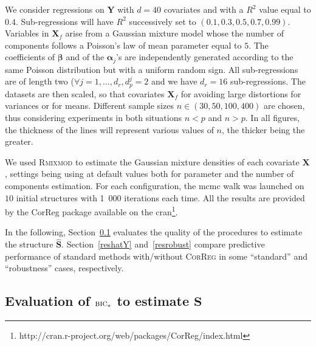 \documentclass[11pt,a4paper]{article}
\begin{document}
We consider regressions on $\boldsymbol{Y}$ with $d=40$ covariates and with a $R^2$ value equal to $0.4$. Sub-regressions will have $R^2$ successively set to $(0.1,0.3,0.5,0.7,0.99)$. Variables in $\boldsymbol{X}_f$ arise from a Gaussian mixture model whose the number of components follows a Poisson's law of mean parameter equal to $5$. The coefficients of $\boldsymbol{\beta}$ and of the $\boldsymbol{\alpha}_j$'s are independently generated according to the same Poisson distribution but with a uniform random sign. All sub-regressions are of length two ($\forall j=1,\ldots,d_r, d_p^j=2$ and we have $d_r=16$ sub-regressions. The datasets are then scaled, so that covariates $\boldsymbol{X}_f$ for avoiding large distortions for variances or for means.	Different sample sizes  $n\in (30,50,100,400)$ are chosen, thus considering experiments in both situations $n<p$ and $n>p$. In all figures, the thickness of the lines will represent various values of $n$, the thicker being the greater.

We used \textsc{Rmixmod} \cite{remi:hal-00919486} to estimate the Gaussian mixture densities of each covariate $\boldsymbol{X}$, settings being using at default values both for parameter and the number of components estimation. For each configuration, the {\sc mcmc} walk was launched on $10$ initial structures with 1~000 iterations each time. All the results are provided by the {\sc CorReg} package available on the {\sc cran}\footnote{http://cran.r-project.org/web/packages/CorReg/index.html}.

\vspace{3mm}	

In the following, Section~\ref{sec:simS} evaluates the quality of the  procedures to estimate the structure $\hat{\boldsymbol{S}}$. Section~\ref{reshatY} and~\ref{resrobust} compare predictive performance of standard methods with/without \textsc{CorReg} in some ``standard'' and ``robustness'' cases, respectively. 
	

	
		
	
		\subsection{Evaluation of $\mbox{\sc bic}_*$ to estimate $\boldsymbol{S}$}\label{sec:simS}
\end{document}
